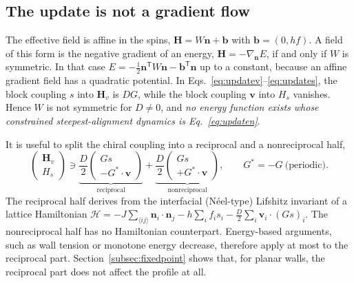 \documentclass[11pt,a4paper]{article}
\newcommand{\nn}{\bm n}
\newcommand{\vv}{\bm v}
\newcommand{\Ham}{\mathcal H}
\begin{document}
\subsection{The update is not a gradient flow}\label{subsec:nonvar}
The effective field is affine in the spins, $\bm H=W\nn+\bm b$ with $\bm b=(0,hf)$. A field of this form is the negative gradient of an energy, $\bm H=-\nabla_{\nn}E$, if and only if $W$ is symmetric. In that case $E=-\tfrac12\nn^{\mathsf T}W\nn-\bm b^{\mathsf T}\nn$ up to a constant, because an affine gradient field has a quadratic potential. In Eqs.~\eqref{eq:updatev}--\eqref{eq:updates}, the block coupling $s$ into $\bm H_v$ is $DG$, while the block coupling $\vv$ into $H_s$ vanishes. Hence $W$ is not symmetric for $D\neq0$, and \emph{no energy function exists whose constrained steepest-alignment dynamics is Eq.~\eqref{eq:updaten}}.

It is useful to split the chiral coupling into a reciprocal and a nonreciprocal half,
\begin{equation}
 \begin{pmatrix}\bm H_v\\ H_s\end{pmatrix}\ni
 \underbrace{\frac D2\begin{pmatrix}Gs\\ -G^{\!*}\!\cdot\vv\end{pmatrix}}_{\text{reciprocal}}
 +\underbrace{\frac D2\begin{pmatrix}Gs\\ +G^{\!*}\!\cdot\vv\end{pmatrix}}_{\text{nonreciprocal}},
 \qquad G^*=-G\ \text{(periodic)}.
 \label{eq:split}
\end{equation}
The reciprocal half derives from the interfacial (N\'eel-type) Lifshitz invariant of a lattice Hamiltonian $\Ham=-J\sum_{\langle ij\rangle}\nn_i\!\cdot\!\nn_j-h\sum_if_is_i-\tfrac D2\sum_i\vv_i\!\cdot\!(Gs)_i$. The nonreciprocal half has no Hamiltonian counterpart. Energy-based arguments, such as wall tension or monotone energy decrease, therefore apply at most to the reciprocal part. Section~\ref{subsec:fixedpoint} shows that, for planar walls, the reciprocal part does not affect the profile at all.
\end{document}
